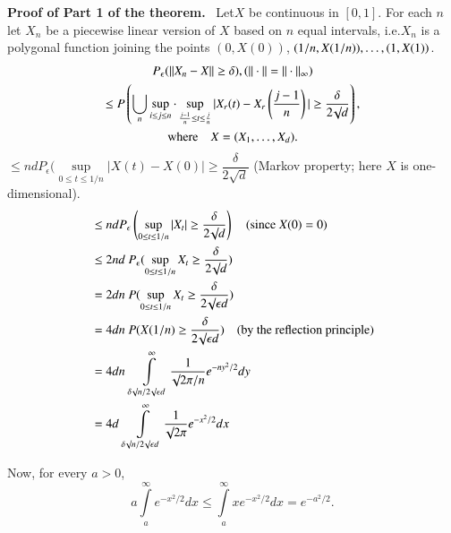 \noindent
{\bf Proof of Part 1 of the theorem.}~ Let\pageoriginale $X$ be continuous in
$[0,1]$. For each $n$ let $X_{n}$ be a piecewise linear version of $X$
based on $n$ equal intervals, i.e.\@ $X_{n}$ is a polygonal function
joining the points $(0,X(0))$, $(1/n,X(1/n)),\ldots,\break (1,X(1))$.
\begin{gather*}
P_{\epsilon}(||X_{n}-X||\geq \delta), (||\cdot||=||\cdot||_{\infty})\\
\leq P\left(\bigcup\limits_{n}\sup\limits_{i\leq j\leq n}\cdot
\sup\limits_{\frac{j-1}{n}\leq t\leq
  \frac{j}{n}}|X_{r}(t)-X_{r}\left(\frac{j-1}{n}\right)|\geq
\frac{\delta}{2\surd d}\right),\\
\text{where}\quad X=(X_{1},\ldots,X_{d}).
\end{gather*}
$\leq nd P_{\epsilon}(\sup\limits_{0\leq t\leq 1/n}|X(t)-X(0)|\geq
\dfrac{\delta}{2\surd d}$ (Markov property; here $X$ is one-dimensional).
\begin{align*}
&\leq nd P_{\epsilon}\left(\sup\limits_{0\leq t\leq 1/n}|X_{t}|\geq
  \frac{\delta}{2\surd d}\right)\quad(\text{since~ } X(0)=0)\\
&\leq 2nd\ P_{\epsilon}(\sup\limits_{0\leq t\leq 1/n}X_{t}\geq
  \frac{\delta}{2\surd d})\\
&=2dn\ P(\sup\limits_{0\leq t\leq 1/n}X_{t}\geq \frac{\delta}{2\surd
    \epsilon d})\\
&= 4dn\ P(X(1/n)\geq \frac{\delta}{2\surd\epsilon d})\quad\text{(by the
    reflection principle)}\\
&=4dn\ \int\limits^{\infty}_{\delta\surd n/2\surd \epsilon
    d}\frac{1}{\surd 2\pi /n}e^{-ny^{2}/2}dy\\
&= 4d\ \int\limits^{\infty}_{\delta\surd n/2\surd \epsilon
    d}\frac{1}{\surd 2\pi}e^{-x^{2}/2}dx
\end{align*}

Now, for every $a>0$,
$$
a\int\limits^{\infty}_{a}e^{-x^{2}/2}dx\leq
\int\limits^{\infty}_{a}xe^{-x^{2}/2}dx=e^{-a^{2}/2}. 
$$

